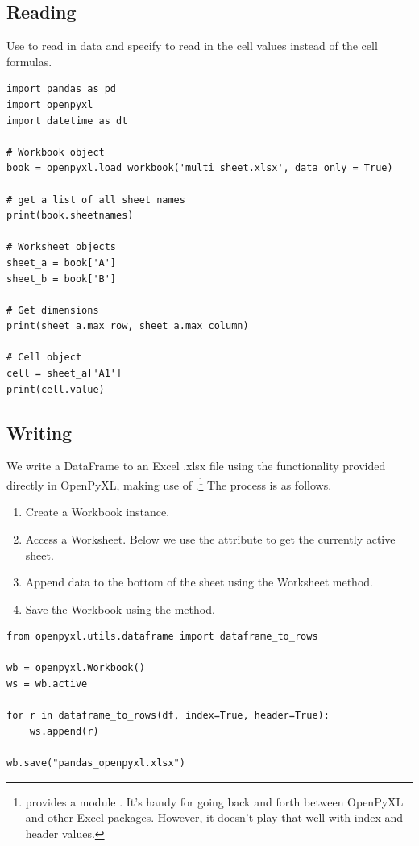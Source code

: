\subsection{Reading}

Use  to read in data and specify  to read in the cell values instead of the cell formulas.

\begin{lstlisting}
import pandas as pd
import openpyxl
import datetime as dt

# Workbook object
book = openpyxl.load_workbook('multi_sheet.xlsx', data_only = True)

# get a list of all sheet names
print(book.sheetnames)

# Worksheet objects
sheet_a = book['A']
sheet_b = book['B']

# Get dimensions
print(sheet_a.max_row, sheet_a.max_column)

# Cell object
cell = sheet_a['A1']
print(cell.value)
\end{lstlisting}

\subsection{Writing}


We write a DataFrame to an Excel .xlsx file using the functionality provided directly in OpenPyXL, making use of .\footnote{\cite{zumstein2021} provides a module . It's handy for going back and forth between OpenPyXL and other Excel packages. However, it doesn't play that well with index and header values.} The process is as follows. 

\begin{enumerate}
    \item Create a Workbook instance.
    \item Access a Worksheet. Below we use the  attribute to get the currently active sheet.
    \item Append data to the bottom of the sheet using the Worksheet  method. 
    \item Save the Workbook using the  method.
\end{enumerate}

\begin{lstlisting}
from openpyxl.utils.dataframe import dataframe_to_rows

wb = openpyxl.Workbook()
ws = wb.active

for r in dataframe_to_rows(df, index=True, header=True):
    ws.append(r)

wb.save("pandas_openpyxl.xlsx")
\end{lstlisting}

